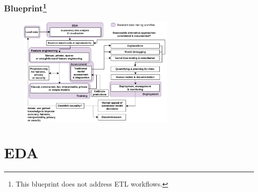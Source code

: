 \documentclass[11pt,
               aspectratio=169,
               hyperref={colorlinks}
               ]{beamer}
\begin{document}
		\begin{frame}				
		
			\frametitle{Blueprint\footnote{\tiny{This blueprint does not address ETL workflows.}}}
							
			\begin{figure}[htb]
				\begin{center}
					\includegraphics[height=150pt]{../img/blueprint.png}
					\label{fig:blueprint}
				\end{center}
			\end{figure}		
		
		\end{frame}

	\section{EDA}
	
\end{document}
